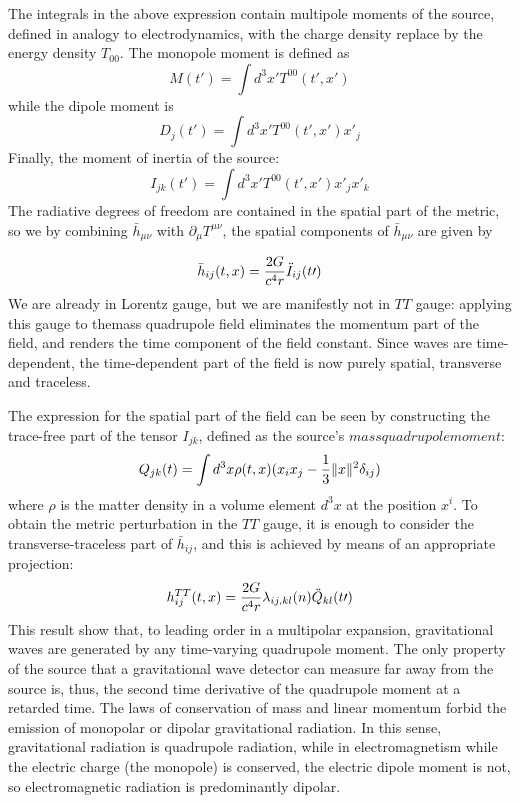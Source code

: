 \documentclass[binding=0.6cm, LaM]{sapthesis}
\begin{document}
The integrals in the above expression contain multipole moments of the source, defined in analogy to electrodynamics, with the charge density replace by the energy density $T_{00}$.
The monopole moment is defined as
\begin{equation}
M(t\prime) = \int d^3x\prime T^{00}(t\prime, x\prime)
\end{equation}
while the dipole moment is
\begin{equation}
D_j(t\prime) = \int d^3x\prime T^{00}(t\prime, x\prime)x\prime_j
\end{equation}
Finally, the moment of inertia of the source:
\begin{equation}
I_{jk}(t\prime) = \int d^3x\prime T^{00}(t\prime, x\prime)x\prime_jx\prime_k
\end{equation}
The radiative degrees of freedom are contained in the spatial part of the metric, so we by combining ${\bar h_{\mu\nu}}$ with $\partial_{\mu} T^{\mu\nu}$, the spatial components of ${\bar h_{\mu\nu}}$ are given by

\begin{equation}
{\bar h_{ij}(t, x)} = {{2G}\over{c^4r}} {\ddot I_{ij}}(t\prime)
\end{equation}
We are already in Lorentz gauge, but we  are manifestly not in $TT$ gauge: applying this gauge to themass quadrupole field eliminates the momentum part of the field, and renders the time component of the field constant. Since waves are time-dependent, the time-dependent part of the field is now purely spatial, transverse and traceless.
 
The expression for the spatial part of the field can be seen by constructing the trace-free part of the tensor $I_{jk}$, defined as the source's $mass quadrupole moment$:
\begin{equation}
Q_{jk}(t) = \int d^3x \rho(t, x) (x_i x_j - {1 \over 3}\|x\|^2 \delta_{ij})  
\end{equation}
where $\rho$ is the matter density in a volume element $d^3x$ at the position $x^i$.
To obtain the metric perturbation in the $TT$ gauge, it is enough to consider the transverse-traceless part of ${\bar h_{ij}}$, and this is achieved by means of an appropriate projection:
\begin{equation}
 h_{ij}^{TT}(t, x) = {{2G}\over{c^4r}}  \lambda_{ij,kl}(n){\ddot Q_{kl}}(t\prime)
\end{equation}
This result show that, to leading order in a multipolar expansion, gravitational waves are generated by any time-varying quadrupole moment.
The only property of the source that a gravitational wave detector can measure far away from the source is, thus, the second time derivative of the quadrupole moment at a retarded time. 
The laws of conservation of mass and linear momentum forbid the emission of monopolar or dipolar gravitational radiation.
In this sense, gravitational radiation is quadrupole radiation, while in electromagnetism while the electric charge (the monopole) is conserved, the electric dipole moment is not, so electromagnetic radiation is predominantly dipolar.
\end{document}
